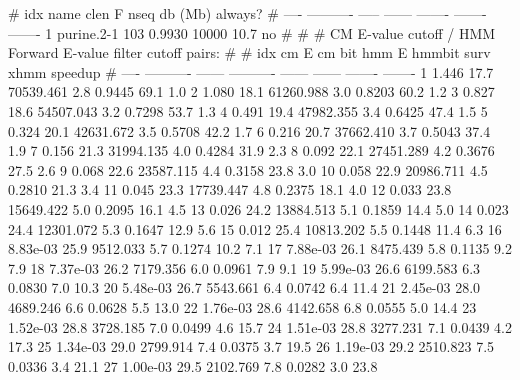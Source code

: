 \begin{sreoutput}
#  idx  name         clen       F     nseq  db (Mb)  always?
# ----  ----------  -----  ------  -------  -------  -------
     1  purine.2-1    103  0.9930    10000     10.7       no
#
#
#       CM E-value cutoff / HMM Forward E-value filter cutoff pairs:
#
#       idx         cm E  cm bit       hmm E  hmmbit    surv     xhmm  speedup
#       ----  ----------  ------  ----------  ------  ------  -------  -------
           1       1.446    17.7   70539.461     2.8  0.9445     69.1      1.0
           2       1.080    18.1   61260.988     3.0  0.8203     60.2      1.2
           3       0.827    18.6   54507.043     3.2  0.7298     53.7      1.3
           4       0.491    19.4   47982.355     3.4  0.6425     47.4      1.5
           5       0.324    20.1   42631.672     3.5  0.5708     42.2      1.7
           6       0.216    20.7   37662.410     3.7  0.5043     37.4      1.9
           7       0.156    21.3   31994.135     4.0  0.4284     31.9      2.3
           8       0.092    22.1   27451.289     4.2  0.3676     27.5      2.6
           9       0.068    22.6   23587.115     4.4  0.3158     23.8      3.0
          10       0.058    22.9   20986.711     4.5  0.2810     21.3      3.4
          11       0.045    23.3   17739.447     4.8  0.2375     18.1      4.0
          12       0.033    23.8   15649.422     5.0  0.2095     16.1      4.5
          13       0.026    24.2   13884.513     5.1  0.1859     14.4      5.0
          14       0.023    24.4   12301.072     5.3  0.1647     12.9      5.6
          15       0.012    25.4   10813.202     5.5  0.1448     11.4      6.3
          16    8.83e-03    25.9    9512.033     5.7  0.1274     10.2      7.1
          17    7.88e-03    26.1    8475.439     5.8  0.1135      9.2      7.9
          18    7.37e-03    26.2    7179.356     6.0  0.0961      7.9      9.1
          19    5.99e-03    26.6    6199.583     6.3  0.0830      7.0     10.3
          20    5.48e-03    26.7    5543.661     6.4  0.0742      6.4     11.4
          21    2.45e-03    28.0    4689.246     6.6  0.0628      5.5     13.0
          22    1.76e-03    28.6    4142.658     6.8  0.0555      5.0     14.4
          23    1.52e-03    28.8    3728.185     7.0  0.0499      4.6     15.7
          24    1.51e-03    28.8    3277.231     7.1  0.0439      4.2     17.3
          25    1.34e-03    29.0    2799.914     7.4  0.0375      3.7     19.5
          26    1.19e-03    29.2    2510.823     7.5  0.0336      3.4     21.1
          27    1.00e-03    29.5    2102.769     7.8  0.0282      3.0     23.8

\end{sreoutput}
